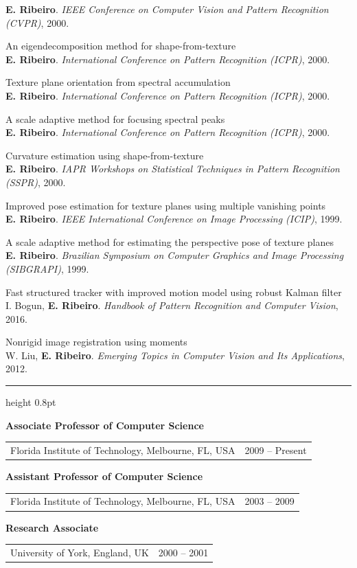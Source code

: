 \documentclass[11pt]{article}
\makeatletter
\newcommand{\cvsection}[1]{%
  \vspace{12pt}%
  {\normalfont\large\scshape\textls[120]{#1}}\par
  \vspace{2pt}\hrule height 0.8pt\vspace{7pt}}
\newcommand{\cvsubsection}[1]{%
  \vspace{6pt}{\normalfont\scshape #1}\par\vspace{3pt}}
\newcommand{\role}[3]{%
  \par\vspace{4pt}\noindent\textbf{#1}\\[1pt]%
  \begin{tabularx}{\linewidth}{@{}Xr@{}}#2 & #3\end{tabularx}\par}
\makeatother
\begin{document}
\begin{cvitems}
  \textbf{E. Ribeiro}. \textit{IEEE Conference on Computer Vision and Pattern Recognition (CVPR)}, 2000.
  \item An eigendecomposition method for shape-from-texture\\
  \textbf{E. Ribeiro}. \textit{International Conference on Pattern Recognition (ICPR)}, 2000.
  \item Texture plane orientation from spectral accumulation\\
  \textbf{E. Ribeiro}. \textit{International Conference on Pattern Recognition (ICPR)}, 2000.
  \item A scale adaptive method for focusing spectral peaks\\
  \textbf{E. Ribeiro}. \textit{International Conference on Pattern Recognition (ICPR)}, 2000.
  \item Curvature estimation using shape-from-texture\\
  \textbf{E. Ribeiro}. \textit{IAPR Workshops on Statistical Techniques in Pattern Recognition (SSPR)}, 2000.
  \item Improved pose estimation for texture planes using multiple vanishing points\\
  \textbf{E. Ribeiro}. \textit{IEEE International Conference on Image Processing (ICIP)}, 1999.
  \item A scale adaptive method for estimating the perspective pose of texture planes\\
  \textbf{E. Ribeiro}. \textit{Brazilian Symposium on Computer Graphics and Image Processing (SIBGRAPI)}, 1999.
\end{cvitems}
\cvsubsection{Book Chapters}
\begin{cvitems}
  \item Fast structured tracker with improved motion model using robust Kalman filter\\
  I. Bogun, \textbf{E. Ribeiro}. \textit{Handbook of Pattern Recognition and Computer Vision}, 2016.
  \item Nonrigid image registration using moments\\
  W. Liu, \textbf{E. Ribeiro}. \textit{Emerging Topics in Computer Vision and Its Applications}, 2012.
\end{cvitems}

\cvsection{Work Experience}
\cvsubsection{Academic}
\role{Associate Professor of Computer Science}{Florida Institute of Technology, Melbourne, FL, USA}{2009 -- Present}
\role{Assistant Professor of Computer Science}{Florida Institute of Technology, Melbourne, FL, USA}{2003 -- 2009}
\role{Research Associate}{University of York, England, UK}{2000 -- 2001}
\end{document}
